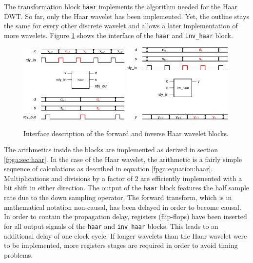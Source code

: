 \begin{refsection}
The transformation block \texttt{haar} implements the algorithm needed for the Haar DWT.
So far, only the Haar wavelet has been implemented.
Yet, the outline stays the same for every other discrete wavelet and allows a later implementation of more wavelets.
Figure \ref{fpga:fig:haar} shows the interface of the \texttt{haar} and \texttt{inv\_haar} block.
\begin{figure}
	\centering
	\includegraphics[width=0.49\textwidth]{papers/fpga/images/haar.pdf} %
	\includegraphics[width=0.49\textwidth]{papers/fpga/images/inv_haar.pdf}
	\caption{Interface description of the forward and inverse Haar wavelet blocks. \label{fpga:fig:haar}}
\end{figure}
The arithmetics inside the blocks are implemented as derived in section \ref{fpga:sec:haar}.
In the case of the Haar wavelet, the arithmetic is a fairly simple sequence of calculations as described in equation \ref{fpga:equation:haar}.
Multiplications and divisions by a factor of 2 are efficiently implemented with a bit shift in either direction.
The output of the \texttt{haar} block features the half sample rate due to the down sampling operator.
The forward transform, which is in mathematical notation non-causal, has been delayed in order to become causal.
In order to contain the propagation delay, registers (flip-flops) have been inserted for all output signals of the \texttt{haar} and \texttt{inv\_haar} blocks.
This leads to an additional delay of one clock cycle.
If longer wavelets than the Haar wavelet were to be implemented, more registers stages are required in order to avoid timing problems. %


\end{refsection}
